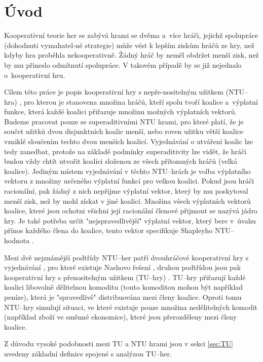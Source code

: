 \section{Úvod}
    Kooperativní teorie her se zabývá hrami se dvěma a~více hráči, jejichž spolupráce (dohodnuti vymahatel-né strategie) může vést k lepším ziskům hráčů ze hry, než kdyby hra proběhla nekooperativně. Žádný hráč by neměl obdržet menší zisk, než by mu přineslo odmítnutí spolupráce. V takovém případě by se již nejednalo o~kooperativní hru.

    Cílem této práce je popis kooperativní hry s nepře-nositelným užitkem (NTU--hra) \cite{Coop_intro,Game_Theory,EOLSS}, pro kterou je stanovena množina hráčů, kteří spolu tvoří koalice a~výplatní funkce, která každé koalici přiřazuje množinu možných výplatních vektorů. Budeme pracovat pouze se superaditivními NTU hrami, pro které platí, že je součet užitků dvou disjunktních koalic menší, nebo roven užitku větší koalice vzniklé sloučením techto dvou menších koalicí. Vyjednávání o utváření koalic lze tedy zanedbat, protože na základě podmínky superaditivity lze vidět, že hráči budou vždy chtít utvořit koalici složenou ze všech přítomných hráčů (velká koalice). Jediným místem vyjednávání v těchto NTU--hrách je volba výplatního vektoru z množiny určeného výplatní funkcí pro velkou koalici. Pokud jsou hráči racionální, pak žádný z nich nepřijme výplatní vektor, který by mu poskytoval menší zisk, než by mohl získat v jiné koalici. Množina všech výplatních vektorů koalice, které jsou ochotni všichni její racionální členové přijmout se nazývá jádro hry. Je také potřeba určit "nejspravedlivější" výplatní vektor, který bere v~úvahu přínos každého člena do koalice, tento vektor specifikuje Shapleyho NTU--hodnota \cite{Shapley1969}.

    Mezi dvě nejznámější podtřídy NTU--her patří dvouhráčové kooperativní hry s vyjednávání \cite{Game_Theory}, pro které existuje Nashovo řešení \cite{Nash1950}, druhou podtřídou jsou pak kooperativní hry s přenositelným užitkem (TU--hry) \cite{Game_Theory,EOLSS}. TU--hry přiřazují každé koalici libovolně dělitelnou komoditu (touto komoditou mohou být například peníze), která je "spravedlivě" distribuována mezi členy koalice. Oproti tomu NTU--hry simulují situaci, ve které existuje pouze množina nedělitelných komodit (například zboží ve směnné ekonomice), které jsou přerozděleny mezi členy koalice.

    Z důvodu vysoké podobnosti mezi TU a NTU hrami jsou v sekci \ref{sec:TU} uvedeny základní definice spojené s analýzou TU--her.

